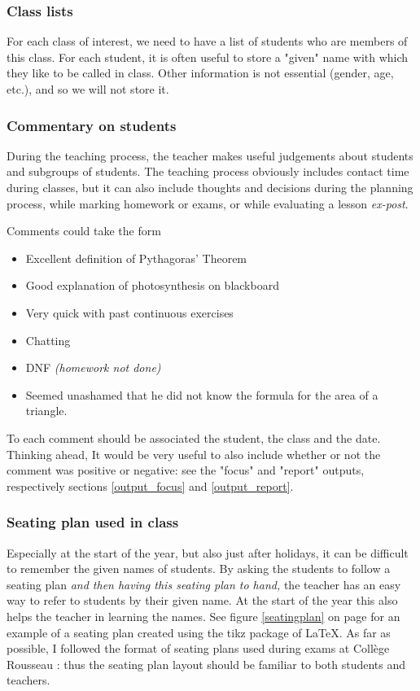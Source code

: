 \documentclass[10pt]{article}
\begin{document}
\subsubsection{Class lists}
For each class of interest, we need to have a list of students who are members of this class. For each student, it is often useful to store a "given" name with which they like to be called in class. Other information is not essential (gender, age, etc.), and so we will not store it.

\subsubsection{Commentary on students}
During the teaching process, the teacher makes useful judgements about students and subgroups of students. The teaching process obviously includes contact time during classes, but it can also include thoughts and decisions during the planning process, while marking homework or exams, or while evaluating a lesson \emph{ex-post}.

Comments could take the form
\begin{itemize}
\item Excellent definition of Pythagoras' Theorem
\item Good explanation of photosynthesis on blackboard
\item Very quick with past continuous exercises
\item Chatting
\item DNF \emph{(homework not done)}
\item Seemed unashamed that he did not know the formula for the area of a triangle.
\end{itemize}

To each comment should be associated the student, the class and the date. Thinking ahead, It would be very useful to also include whether or not the comment was positive or negative: see the "focus" and "report" outputs, respectively sections \ref{output_focus} and \ref{output_report}.

\subsubsection{Seating plan used in class}
Especially at the start of the year, but also just after holidays, it can be difficult to remember the given names of students. By asking the students to follow a seating plan \emph{and then having this seating plan to hand,} the teacher has an easy way to refer to students by their given name. At the start of the year this also helps the teacher in learning the names. See figure \ref{seatingplan} on page \pageref{seatingplan} for an example of a seating plan created using the tikz package of LaTeX. As far as possible, I followed the format of seating plans used during exams at Collège Rousseau : thus the seating plan layout should be familiar to both students and teachers.
\end{document}
